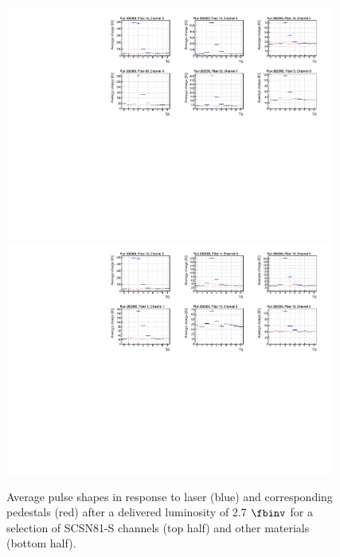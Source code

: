 \begin{figure}[tbp!]
\centering
\includegraphics[width=0.97\textwidth]{figures/analysis/Pulse_shape_run282369_bright_SCSN81S.pdf}
\includegraphics[width=0.97\textwidth]{figures/analysis/Pulse_shape_run282369_bright_others.pdf}
\caption{Average pulse shapes in response to laser (blue) and corresponding pedestals (red) after a delivered luminosity of 2.7 $\fbinv$ for a selection of SCSN81-S channels (top half) and other materials (bottom half).}
\label{pulse2p7ifb}
\end{figure} 

